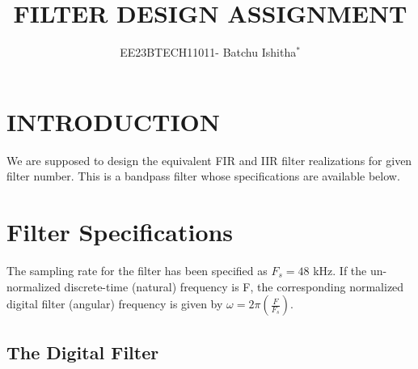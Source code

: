 \documentclass{article}
\begin{document}
\title{ FILTER DESIGN ASSIGNMENT}
\author{EE23BTECH11011- Batchu Ishitha$^{*}$%
}
\maketitle

\bigskip

\renewcommand{\thefigure}{\theenumi}
\renewcommand{\thetable}{\theenumi}

\section{\textbf{INTRODUCTION}}
We are supposed to design the equivalent FIR and IIR filter realizations for  given filter number.  
This is a bandpass filter whose specifications are available below.

\section{\textbf{Filter Specifications}}
The sampling rate for the filter has been specified as $F_s =  48$ kHz.	If the un-normalized  discrete-time (natural) frequency is F, the corresponding normalized digital filter (angular) frequency is given by $\omega = 2\pi\left(\frac{F}{F_s}\right)$.

\subsection{\textbf{The Digital Filter}}
\end{document}
